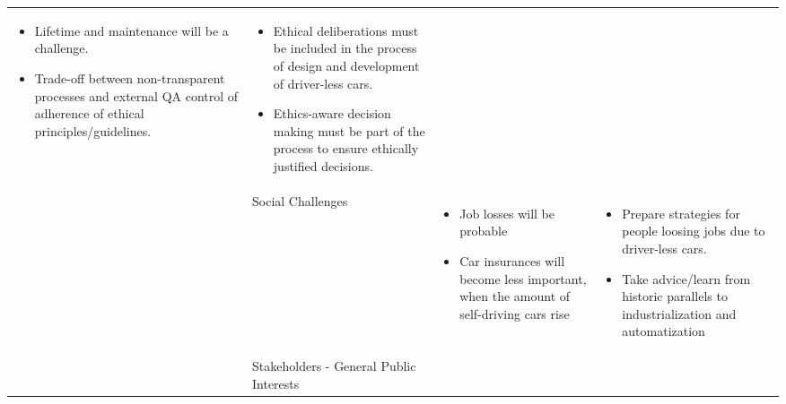 \begin{table}
\begin{small}
\begin{supertabular}{>{}p{.02\textwidth}|>{\raggedright}p{.105\textwidth}>{\raggedright}p{.4\textwidth}>{\raggedright}p{.4\textwidth}}
\begin{itemize}
					\item Lifetime and maintenance will be a challenge.
					\item Trade-off between non-transparent processes and external QA control of adherence of ethical principles/guidelines.
				\end{itemize}                   
			& 
				\begin{itemize}
					\item Ethical deliberations must be included in the process of design and development of driver-less cars.
					\item Ethics-aware decision making must be part of the process to ensure ethically justified decisions.
				\end{itemize}
			\tabularnewline {}
			 &Social Challenges & 
				\begin{itemize}
					\item Job losses will be probable
					\item Car insurances will become less important, when the amount of self-driving cars rise 
				\end{itemize}         
			& 	
				\begin{itemize}
					\item Prepare strategies for people loosing jobs due to driver-less cars.
					\item Take advice/learn from historic parallels to industrialization and automatization
				\end{itemize} 
			\tabularnewline {}
			& Stakeholders - General Public Interests & 
				\begin{itemize}

\end{itemize}
\end{supertabular}
\end{small}
\end{table}
